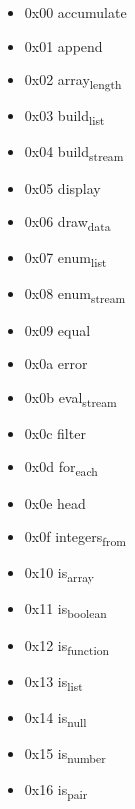\begin{itemize}
\item 0x00 accumulate

\item 0x01 append

\item 0x02 array\textsubscript{length}

\item 0x03 build\textsubscript{list}

\item 0x04 build\textsubscript{stream}

\item 0x05 display

\item 0x06 draw\textsubscript{data}

\item 0x07 enum\textsubscript{list}

\item 0x08 enum\textsubscript{stream}

\item 0x09 equal

\item 0x0a error

\item 0x0b eval\textsubscript{stream}

\item 0x0c filter

\item 0x0d for\textsubscript{each}

\item 0x0e head

\item 0x0f integers\textsubscript{from}

\item 0x10 is\textsubscript{array}

\item 0x11 is\textsubscript{boolean}

\item 0x12 is\textsubscript{function}

\item 0x13 is\textsubscript{list}

\item 0x14 is\textsubscript{null}

\item 0x15 is\textsubscript{number}

\item 0x16 is\textsubscript{pair}


\end{itemize}
